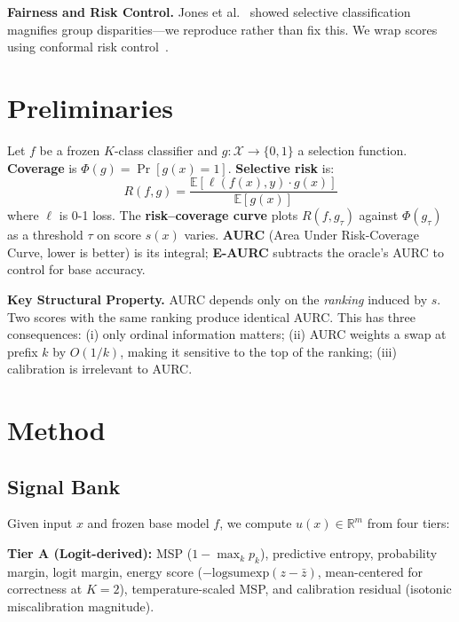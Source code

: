 \documentclass[conference]{IEEEtran}
\begin{document}
\textbf{Fairness and Risk Control.} Jones et al.~\cite{jones2021disparities} showed selective classification magnifies group disparities---we reproduce rather than fix this. We wrap scores using conformal risk control~\cite{angelopoulos2022riskcontrol, angelopoulos2021learnthentest}.

\section{Preliminaries}
\label{sec:prelim}

Let $f$ be a frozen $K$-class classifier and $g: \mathcal{X} \to \{0,1\}$ a selection function. \textbf{Coverage} is $\Phi(g) = \Pr[g(x)=1]$. \textbf{Selective risk} is:
\begin{equation}
  R(f,g) = \frac{\mathbb{E}[\ell(f(x),y) \cdot g(x)]}{\mathbb{E}[g(x)]}
\end{equation}
where $\ell$ is 0-1 loss. The \textbf{risk--coverage curve} plots $R(f, g_\tau)$ against $\Phi(g_\tau)$ as a threshold $\tau$ on score $s(x)$ varies. \textbf{AURC} (Area Under Risk-Coverage Curve, lower is better) is its integral; \textbf{E-AURC} subtracts the oracle's AURC to control for base accuracy.

\textbf{Key Structural Property.} AURC depends only on the \emph{ranking} induced by $s$. Two scores with the same ranking produce identical AURC. This has three consequences: (i) only ordinal information matters; (ii) AURC weights a swap at prefix $k$ by $O(1/k)$, making it sensitive to the top of the ranking; (iii) calibration is irrelevant to AURC.

\section{Method}
\label{sec:method}

\subsection{Signal Bank}
Given input $x$ and frozen base model $f$, we compute $u(x) \in \mathbb{R}^m$ from four tiers:

\textbf{Tier A (Logit-derived):} MSP ($1 - \max_k p_k$), predictive entropy, probability margin, logit margin, energy score ($-\mathrm{logsumexp}(z - \bar{z})$, mean-centered for correctness at $K{=}2$), temperature-scaled MSP, and calibration residual (isotonic miscalibration magnitude).
\end{document}
